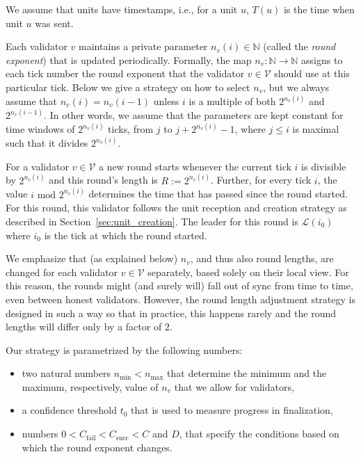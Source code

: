 \documentclass[12pt, fleqn]{article}
\newcommand{\nmin}{n_{\mathrm{min}}}
\newcommand{\nmax}{n_{\mathrm{max}}}
\newcommand{\cV}{\mathcal{V}}
\newcommand{\cL}{\mathcal{L}}
\begin{document}
We assume that units have timestamps, i.e., for a unit $u$, $T(u)$ is the time when unit $u$ was sent.

Each validator $v$ maintains a private parameter $n_v(i) \in \mathbb{N}$ (called the {\it round exponent}) that is updated periodically. Formally, the map $n_v: \mathbb{N} \rightarrow \mathbb{N}$ assigns to each tick number the round exponent that the validator $v\in \cV$ should use at this particular tick.
%
Below we give a strategy on how to select $n_v$, but we always assume that $n_v (i) = n_v (i - 1)$ unless $i$ is a multiple of both $2^{n_v(i)}$ and $2^{n_v(i-1)}$. In other words, we assume that the parameters are kept constant for time windows of $2^{n_v(i)}$ ticks, from $j$ to $j + 2^{n_v(i)} - 1$, where $j \leq i$ is maximal such that it divides $2^{n_v(i)}$. %
%


For a validator $v\in \cV$ a new round starts whenever the current tick $i$ is divisible by $2^{n_v(i)}$ and this round's length is $R:=2^{n_v(i)}$.
%
Further, for every tick $i$, the value $i \mbox{ mod }2^{n_v(i)}$ determines the time that has passed since the round started.
%
For this round, this validator follows the unit reception and creation strategy as described in Section~\ref{sec:unit_creation}.
%
The leader for this round is $\cL(i_0)$ where $i_0$ is the tick at which the round started.

We emphasize that (as explained below) $n_v$, and thus also round lengths, are changed for each validator $v\in \cV$ separately, based solely on their local view.
%
For this reason, the rounds might (and surely will) fall out of sync from time to time, even between honest validators.
%
However, the round length adjustment strategy is designed in such a way so that in practice, this happens rarely and the round lengths will differ only by a factor of $2$.


 Our strategy is parametrized by the following numbers:
\begin{itemize}
    \item two natural numbers $\nmin<\nmax$ that determine the minimum and the maximum, respectively, value of $n_v$ that we allow for validators,
    \item a confidence threshold $t_0$ that is used to measure progress in finalization,
    \item numbers $0<C_{\mathrm{fail}}< C_{\mathrm{succ}} <C$ and $D$, that specify the conditions based on which the round exponent changes.
\end{itemize}
\end{document}
